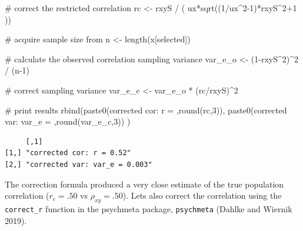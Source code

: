\documentclass[
  letterpaper,
  DIV=11,
  numbers=noendperiod]{scrreprt}
\newenvironment{Shaded}{\begin{snugshade}}{\end{snugshade}}
\newcommand{\CommentTok}[1]{\textcolor[rgb]{0.37,0.37,0.37}{#1}}
\newcommand{\DecValTok}[1]{\textcolor[rgb]{0.68,0.00,0.00}{#1}}
\newcommand{\FunctionTok}[1]{\textcolor[rgb]{0.28,0.35,0.67}{#1}}
\newcommand{\NormalTok}[1]{\textcolor[rgb]{0.00,0.23,0.31}{#1}}
\newcommand{\OtherTok}[1]{\textcolor[rgb]{0.00,0.23,0.31}{#1}}
\newcommand{\SpecialCharTok}[1]{\textcolor[rgb]{0.37,0.37,0.37}{#1}}
\newcommand{\StringTok}[1]{\textcolor[rgb]{0.13,0.47,0.30}{#1}}
\begin{document}
\begin{Shaded}
\begin{Highlighting}[]
\CommentTok{\# correct the restricted correlation}
\NormalTok{rc }\OtherTok{\textless{}{-}}\NormalTok{ rxyS }\SpecialCharTok{/}\NormalTok{ ( ux}\SpecialCharTok{*}\FunctionTok{sqrt}\NormalTok{((}\DecValTok{1}\SpecialCharTok{/}\NormalTok{ux}\SpecialCharTok{\^{}}\DecValTok{2{-}1}\NormalTok{)}\SpecialCharTok{*}\NormalTok{rxyS}\SpecialCharTok{\^{}}\DecValTok{2}\SpecialCharTok{+}\DecValTok{1}\NormalTok{ ))}

\CommentTok{\# acquire sample size from }
\NormalTok{n }\OtherTok{\textless{}{-}} \FunctionTok{length}\NormalTok{(x[selected])}

\CommentTok{\# calculate the observed correlation sampling variance}
\NormalTok{var\_e\_o }\OtherTok{\textless{}{-}}\NormalTok{ (}\DecValTok{1}\SpecialCharTok{{-}}\NormalTok{rxyS}\SpecialCharTok{\^{}}\DecValTok{2}\NormalTok{)}\SpecialCharTok{\^{}}\DecValTok{2} \SpecialCharTok{/}\NormalTok{ (n}\DecValTok{{-}1}\NormalTok{)}

\CommentTok{\# correct sampling variance}
\NormalTok{var\_e\_c }\OtherTok{\textless{}{-}}\NormalTok{ var\_e\_o }\SpecialCharTok{*}\NormalTok{ (rc}\SpecialCharTok{/}\NormalTok{rxyS)}\SpecialCharTok{\^{}}\DecValTok{2}

\CommentTok{\# print results}
\FunctionTok{rbind}\NormalTok{(}\FunctionTok{paste0}\NormalTok{(}\StringTok{\textquotesingle{}corrected cor: r = \textquotesingle{}}\NormalTok{,}\FunctionTok{round}\NormalTok{(rc,}\DecValTok{3}\NormalTok{)),}
      \FunctionTok{paste0}\NormalTok{(}\StringTok{\textquotesingle{}corrected var: var\_e = \textquotesingle{}}\NormalTok{,}\FunctionTok{round}\NormalTok{(var\_e\_c,}\DecValTok{3}\NormalTok{))}
\NormalTok{      )}
\end{Highlighting}
\end{Shaded}

\begin{verbatim}
     [,1]                          
[1,] "corrected cor: r = 0.52"     
[2,] "corrected var: var_e = 0.003"
\end{verbatim}

The correction formula produced a very close estimate of the true
population correlation (\(r_c = .50\) vs \(\rho_{xy}=.50\)). Lets also
correct the correlation using the \texttt{correct\_r} function in the
psychmeta package, \texttt{psychmeta} (Dahlke and Wiernik 2019).
\end{document}
